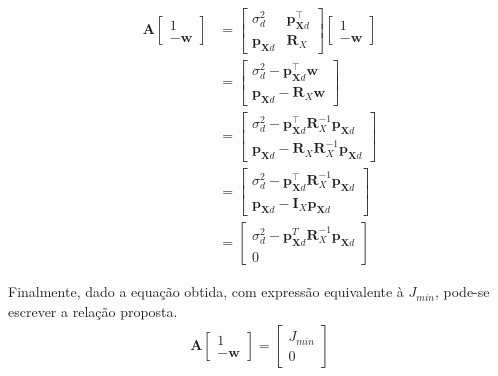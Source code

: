 \begin{align*}
    \mathbf{A} \left[ \begin{matrix} 1 \\ -\mathbf{w} \end{matrix} \right] &= \left[ \begin{matrix} \sigma^{2}_{d} & \mathbf{p}_{\mathbf{X} d}^{\top} \\
        \mathbf{p}_{\mathbf{X} d} & \mathbf{R}_{X} \end{matrix} \right] \left[ \begin{matrix} 1 \\ -\mathbf{w} \end{matrix} \right] \\
        &=   \left[ \begin{matrix} \sigma^{2}_{d} - \mathbf{p}_{\mathbf{X} d}^{\top}\mathbf{w} \\ \mathbf{p}_{\mathbf{X} d} - \mathbf{R}_{X}\mathbf{w} \end{matrix} \right] \\
        &=   \left[ \begin{matrix} \sigma^{2}_{d} - \mathbf{p}_{\mathbf{X} d}^{\top}\mathbf{R}^{-1}_{X} \mathbf{p}_{\mathbf{X} d} \\
            \mathbf{p}_{\mathbf{X} d} - \mathbf{R}_{X}\mathbf{R}^{-1}_{X} \mathbf{p}_{\mathbf{X} d} \end{matrix} \right] \\
        &=   \left[ \begin{matrix} \sigma^{2}_{d} - \mathbf{p}_{\mathbf{X} d}^{\top}\mathbf{R}^{-1}_{X} \mathbf{p}_{\mathbf{X} d} \\
            \mathbf{p}_{\mathbf{X} d} - \mathbf{I}_{X}\mathbf{p}_{\mathbf{X} d} \end{matrix} \right] \\
        &=   \left[ \begin{matrix} \sigma^{2}_{d} - \mathbf{p}_{\mathbf{X} d}^{T
            }\mathbf{R}^{-1}_{X} \mathbf{p}_{\mathbf{X} d} \\ 0 \end{matrix} \right]
\end{align*}

Finalmente, dado a equação obtida, com expressão equivalente à $J_{min}$, pode-se escrever a relação proposta.
\begin{align*}
    \mathbf{A} \left[ \begin{matrix} 1 \\ -\mathbf{w} \end{matrix} \right] = \left[ \begin{matrix} J_{min} \\ 0 \end{matrix} \right]
\end{align*}



